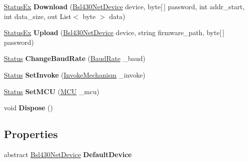 \begin{DoxyCompactItemize}
\item 
\mbox{\label{class_b_s_l430___n_e_t_1_1_main_1_1_core_afd3c6a4d35f11ed8bdfd55dec9e8d3ed}} 
\mbox{\hyperlink{class_b_s_l430___n_e_t_1_1_status_ex}{Status\+Ex}} {\bfseries Download} (\mbox{\hyperlink{class_b_s_l430___n_e_t_1_1_bsl430_net_device}{Bsl430\+Net\+Device}} device, byte\mbox{[}$\,$\mbox{]} password, int addr\+\_\+start, int data\+\_\+size, out List$<$ byte $>$ data)
\item 
\mbox{\label{class_b_s_l430___n_e_t_1_1_main_1_1_core_aeb4c190c05214b8f6d75724c16a56353}} 
\mbox{\hyperlink{class_b_s_l430___n_e_t_1_1_status_ex}{Status\+Ex}} {\bfseries Upload} (\mbox{\hyperlink{class_b_s_l430___n_e_t_1_1_bsl430_net_device}{Bsl430\+Net\+Device}} device, string firmware\+\_\+path, byte\mbox{[}$\,$\mbox{]} password)
\item 
\mbox{\label{class_b_s_l430___n_e_t_1_1_main_1_1_core_a3627709383235c85031a0f5bed11c757}} 
\mbox{\hyperlink{class_b_s_l430___n_e_t_1_1_status}{Status}} {\bfseries Change\+Baud\+Rate} (\mbox{\hyperlink{namespace_b_s_l430___n_e_t_a8d30c263598635a481840944d38aeb70}{Baud\+Rate}} \+\_\+baud)
\item 
\mbox{\label{class_b_s_l430___n_e_t_1_1_main_1_1_core_ad5aa3a0ef383226c61da5a00981393d4}} 
\mbox{\hyperlink{class_b_s_l430___n_e_t_1_1_status}{Status}} {\bfseries Set\+Invoke} (\mbox{\hyperlink{namespace_b_s_l430___n_e_t_a6571fdf0fbbc8408b8428f4d642c1305}{Invoke\+Mechanism}} \+\_\+invoke)
\item 
\mbox{\label{class_b_s_l430___n_e_t_1_1_main_1_1_core_a5a75292bb40a56c3abfda4b36595e528}} 
\mbox{\hyperlink{class_b_s_l430___n_e_t_1_1_status}{Status}} {\bfseries Set\+M\+CU} (\mbox{\hyperlink{namespace_b_s_l430___n_e_t_a2cdaa65be7e1679fc8ca77610b19a490}{M\+CU}} \+\_\+mcu)
\item 
\mbox{\label{class_b_s_l430___n_e_t_1_1_main_1_1_core_a4e5fbdfc5c482b71a0e33df83dd9dbd3}} 
void {\bfseries Dispose} ()
\end{DoxyCompactItemize}
\subsection*{Properties}
\begin{DoxyCompactItemize}
\item 
\mbox{\label{class_b_s_l430___n_e_t_1_1_main_1_1_core_a86e4f9ad6d003018864dc381643a85e4}} 
abstract \mbox{\hyperlink{class_b_s_l430___n_e_t_1_1_bsl430_net_device}{Bsl430\+Net\+Device}} {\bfseries Default\+Device}
\end{DoxyCompactItemize}


